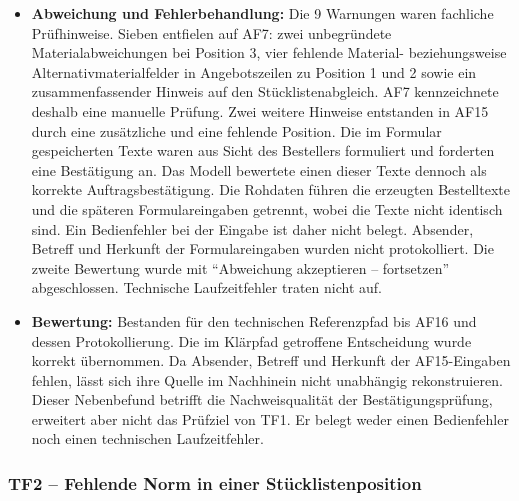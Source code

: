 \documentclass[a4paper,12pt]{article}
\begin{document}
\begin{itemize}
    \item \textbf{Abweichung und Fehlerbehandlung:} Die 9 Warnungen waren fachliche Prüfhinweise. Sieben entfielen auf AF7: zwei unbegründete Materialabweichungen bei Position 3, vier fehlende Material- beziehungsweise Alternativmaterialfelder in Angebotszeilen zu Position 1 und 2 sowie ein zusammenfassender Hinweis auf den Stücklistenabgleich. AF7 kennzeichnete deshalb eine manuelle Prüfung. Zwei weitere Hinweise entstanden in AF15 durch eine zusätzliche und eine fehlende Position. Die im Formular gespeicherten Texte waren aus Sicht des Bestellers formuliert und forderten eine Bestätigung an. Das Modell bewertete einen dieser Texte dennoch als korrekte Auftragsbestätigung. Die Rohdaten führen die erzeugten Bestelltexte und die späteren Formulareingaben getrennt, wobei die Texte nicht identisch sind. Ein Bedienfehler bei der Eingabe ist daher nicht belegt. Absender, Betreff und Herkunft der Formulareingaben wurden nicht protokolliert. Die zweite Bewertung wurde mit \enquote{Abweichung akzeptieren -- fortsetzen} abgeschlossen. Technische Laufzeitfehler traten nicht auf.
    \item \textbf{Bewertung:} Bestanden für den technischen Referenzpfad bis AF16 und dessen Protokollierung. Die im Klärpfad getroffene Entscheidung wurde korrekt übernommen. Da Absender, Betreff und Herkunft der AF15-Eingaben fehlen, lässt sich ihre Quelle im Nachhinein nicht unabhängig rekonstruieren. Dieser Nebenbefund betrifft die Nachweisqualität der Bestätigungsprüfung, erweitert aber nicht das Prüfziel von TF1. Er belegt weder einen Bedienfehler noch einen technischen Laufzeitfehler.
\end{itemize}

\subsubsection{TF2 -- Fehlende Norm in einer Stücklistenposition}
\end{document}
